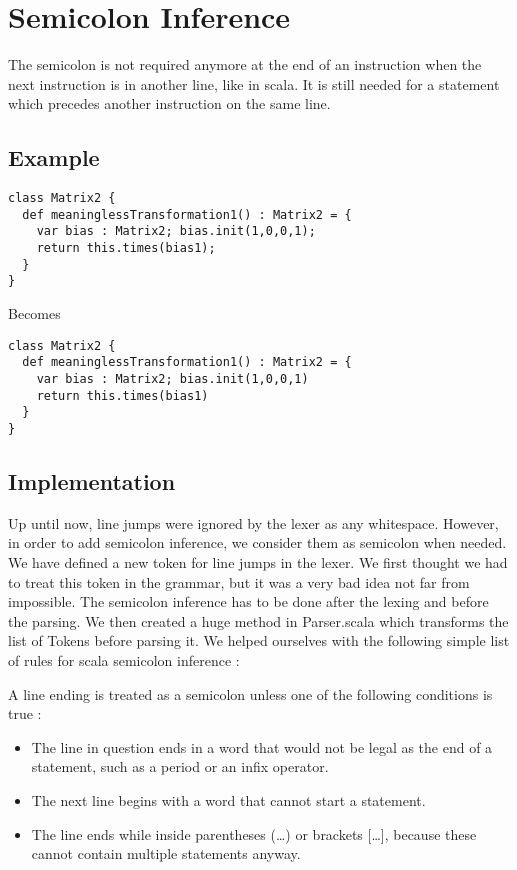 \section{Semicolon Inference}

\textnormal{The semicolon is not required anymore at the end of an instruction
  when the next instruction is in another line, like in scala. It is still needed
  for a statement which precedes another instruction on the same line.}

\subsection{Example}

\begin{lstlisting}
class Matrix2 {
  def meaninglessTransformation1() : Matrix2 = {
    var bias : Matrix2; bias.init(1,0,0,1);
    return this.times(bias1);
  }
}
\end{lstlisting}
\textmd{Becomes}
\begin{lstlisting}
class Matrix2 {
  def meaninglessTransformation1() : Matrix2 = {
    var bias : Matrix2; bias.init(1,0,0,1)
    return this.times(bias1)
  }
}
\end{lstlisting}

\subsection{Implementation}


\textnormal{Up until now, line jumps were ignored by the lexer as any
  whitespace. However, in order to add semicolon inference, we consider them as
  semicolon when needed. We have defined a new token for line jumps in the lexer.
  We first thought we had to treat this token in the grammar, but it was a very
  bad idea not far from impossible. The semicolon inference has to be done after
  the lexing and before the parsing. We then created a huge method in Parser.scala
  which transforms the list of Tokens before parsing it. We helped ourselves
  with the following simple list of rules for scala semicolon inference \cite{rules_semicolon} :} 

\begin{itshape}
  A line ending is treated as a semicolon unless one of the following conditions
  is true :
  \begin{itemize}
  \item The line in question ends in a word that would not be legal as the end
    of a statement, such as a period or an infix operator.
  \item The next line begins with a word that cannot start a statement.
  \item The line ends while inside parentheses (\ldots) or brackets [\ldots], because
    these cannot contain multiple statements anyway.
  \end{itemize}
\end{itshape}

